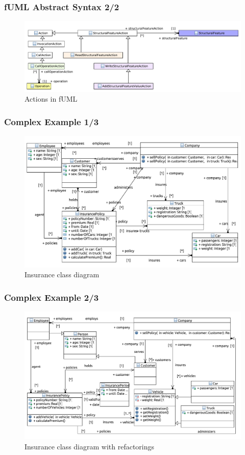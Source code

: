 \documentclass{beamer}
\begin{document}
\begin{frame}
\frametitle{fUML Abstract Syntax 2/2}
\begin{figure}[h!t]
 \centering
 \includegraphics[scale=0.5]{images/Model_Model_Behavior}
 \caption{Actions in fUML}
 \label{fig:behavior}
\end{figure}
\end{frame}

\begin{frame}
\frametitle{Complex Example 1/3}
\begin{figure}[h!t]
 \centering
 \includegraphics[scale=0.4]{images/insurance/Model_Model_ClassDiagram}
 \caption{Insurance class diagram}
 \label{fig:classdiagramcomplexRef}
\end{figure}
\end{frame}

        
\begin{frame}
\frametitle{Complex Example 2/3}
\begin{figure}[h!t]
 \centering
 \includegraphics[scale=0.4]{images/insurance_ref/Model_Model_ClassDiagram}
 \caption{Insurance class diagram with refactorings}
 \label{fig:classdiagramcomplex}
\end{figure}
\end{frame}
\end{document}
